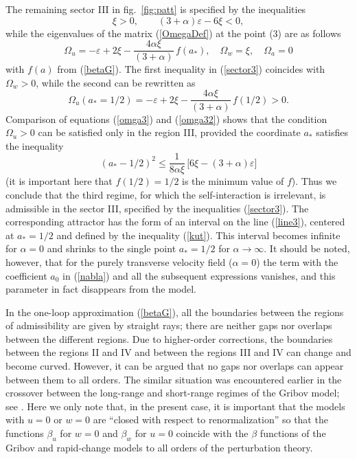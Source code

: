 \documentclass[12pt]{article}
\begin{document}
The remaining sector III in fig.~\ref{fig:patt} is specified by the
inequalities
\begin{equation}
\xi > 0, \qquad (3+\alpha) \varepsilon -6\xi<0,
\label{sector3}
\end{equation}
while the eigenvalues of the matrix (\ref{OmegaDef}) at the point (3)
are as follows
\begin{equation}
\Omega_{u} =  -\varepsilon+2\xi- \frac{4\alpha\xi}{(3+\alpha)}\, f(a_{*}),
\quad \Omega_{w} = \xi, \quad \Omega_{a} = 0
\label{omga3}
\end{equation}
with $f(a)$ from (\ref{betaG}). The first inequality in (\ref{sector3})
coincides with $\Omega_{w}>0$, while the second can be rewritten as
\begin{equation}
\Omega_{u}({a_{*}=1/2}) = -\varepsilon+2\xi-
\frac{4\alpha\xi}{(3+\alpha)}\, f(1/2) >0.
\label{omga32}
\end{equation}
Comparison of equations (\ref{omga3}) and (\ref{omga32}) shows that the
condition $\Omega_{u}>0$ can be satisfied only in the region III, provided
the coordinate $a_{*}$ satisfies the inequality
\begin{equation}
(a_{*}-1/2)^{2} \le \frac{1}{8\alpha\xi}\,
\bigl[ 6\xi- (3+\alpha)\varepsilon \bigr]
\label{kut}
\end{equation}
(it is important here that $f(1/2)=1/2$ is the minimum value of $f$).
Thus we conclude that the third regime, for which the self-interaction is
irrelevant, is admissible in the sector III, specified by the inequalities
(\ref{sector3}). The corresponding attractor has the form of an interval
on the line (\ref{line3}), centered at $a_{*}=1/2$ and defined by the
inequality (\ref{kut}). This interval becomes infinite for $\alpha=0$
and shrinks to the single point $a_{*}=1/2$ for $\alpha\to\infty$.
It should be noted, however, that for the purely transverse velocity
field ($\alpha=0$) the term with the coefficient $a_{0}$ in (\ref{nabla})
and all the subsequent expressions vanishes, and this parameter in fact
disappears from the model.


In the one-loop approximation (\ref{betaG}), all the boundaries between the
regions of admissibility are given by straight rays; there are neither gaps
nor overlaps between the different regions. Due to higher-order corrections,
the boundaries between the regions II and IV and between the regions III and
IV can change and become curved. However, it can be argued that no gaps nor
overlaps can appear between them to all orders. The similar situation was
encountered earlier in the crossover between the long-range and short-range
regimes of the Gribov model; see \cite{Levy}. Here we only note that,
in the present case, it is important that the models with $u=0$ or $w=0$ are
``closed with respect to renormalization'' so that the functions $\beta_{u}$
for $w=0$ and $\beta_{w}$ for $u=0$ coincide with the $\beta$ functions of
the Gribov and rapid-change models to all orders of the perturbation theory.
\end{document}
